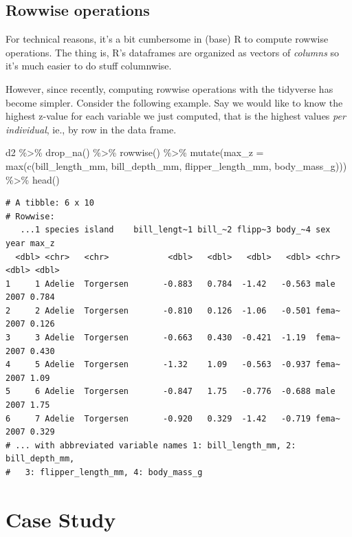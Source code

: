 \documentclass[
  letterpaper,
  DIV=11,
  numbers=noendperiod]{scrreprt}
\newenvironment{Shaded}{\begin{snugshade}}{\end{snugshade}}
\newcommand{\AttributeTok}[1]{\textcolor[rgb]{0.40,0.45,0.13}{#1}}
\newcommand{\FunctionTok}[1]{\textcolor[rgb]{0.28,0.35,0.67}{#1}}
\newcommand{\NormalTok}[1]{\textcolor[rgb]{0.00,0.23,0.31}{#1}}
\newcommand{\SpecialCharTok}[1]{\textcolor[rgb]{0.37,0.37,0.37}{#1}}
\theoremstyle{definition}
\theoremstyle{definition}
\theoremstyle{remark}
\begin{document}
\hypertarget{rowwise-operations}{%
\subsection{Rowwise operations}\label{rowwise-operations}}

For technical reasons, it's a bit cumbersome in (base) R to compute
rowwise operations. The thing is, R's dataframes are organized as
vectors of \emph{columns} so it's much easier to do stuff columnwise.

However, since recently, computing rowwise operations with the tidyverse
has become simpler. Consider the following example. Say we would like to
know the highest z-value for each variable we just computed, that is the
highest values \emph{per individual}, ie., by row in the data frame.

\begin{Shaded}
\begin{Highlighting}[]
\NormalTok{d2 }\SpecialCharTok{\%\textgreater{}\%} 
  \FunctionTok{drop\_na}\NormalTok{() }\SpecialCharTok{\%\textgreater{}\%} 
  \FunctionTok{rowwise}\NormalTok{() }\SpecialCharTok{\%\textgreater{}\%} 
  \FunctionTok{mutate}\NormalTok{(}\AttributeTok{max\_z =} \FunctionTok{max}\NormalTok{(}\FunctionTok{c}\NormalTok{(bill\_length\_mm, bill\_depth\_mm, flipper\_length\_mm, body\_mass\_g))) }\SpecialCharTok{\%\textgreater{}\%} 
  \FunctionTok{head}\NormalTok{()}
\end{Highlighting}
\end{Shaded}

\begin{verbatim}
# A tibble: 6 x 10
# Rowwise: 
   ...1 species island    bill_lengt~1 bill_~2 flipp~3 body_~4 sex    year max_z
  <dbl> <chr>   <chr>            <dbl>   <dbl>   <dbl>   <dbl> <chr> <dbl> <dbl>
1     1 Adelie  Torgersen       -0.883   0.784  -1.42   -0.563 male   2007 0.784
2     2 Adelie  Torgersen       -0.810   0.126  -1.06   -0.501 fema~  2007 0.126
3     3 Adelie  Torgersen       -0.663   0.430  -0.421  -1.19  fema~  2007 0.430
4     5 Adelie  Torgersen       -1.32    1.09   -0.563  -0.937 fema~  2007 1.09 
5     6 Adelie  Torgersen       -0.847   1.75   -0.776  -0.688 male   2007 1.75 
6     7 Adelie  Torgersen       -0.920   0.329  -1.42   -0.719 fema~  2007 0.329
# ... with abbreviated variable names 1: bill_length_mm, 2: bill_depth_mm,
#   3: flipper_length_mm, 4: body_mass_g
\end{verbatim}

\hypertarget{case-study-2}{%
\section{Case Study}\label{case-study-2}}
\end{document}
